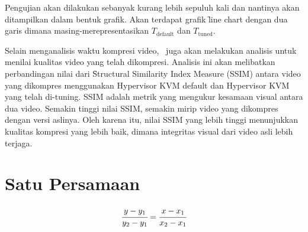     Pengujian akan dilakukan sebanyak kurang lebih sepuluh kali dan nantinya akan ditampilkan dalam bentuk grafik. Akan terdapat grafik \f{line chart} dengan dua garis dimana masing-merepresentasikan $T_{\mathrm{default}}$ dan $T_{\mathrm{tuned}}$.

    Selain menganalisis waktu kompresi video, \saya\ juga akan melakukan analisis untuk menilai kualitas video yang telah dikompresi. Analisis ini akan melibatkan perbandingan nilai dari \f{Structural Similarity Index Measure} (SSIM) antara video yang dikompres menggunakan Hypervisor KVM default dan Hypervisor KVM yang telah di-tuning. SSIM adalah metrik yang mengukur kesamaan visual antara dua video. Semakin tinggi nilai SSIM, semakin mirip video yang dikompres dengan versi aslinya. Oleh karena itu, nilai SSIM yang lebih tinggi menunjukkan kualitas kompresi yang lebih baik, dimana integritas visual dari video asli lebih terjaga.

    \section{Satu Persamaan}

    \noindent \begin{align}\label{eq:garis}
        \cfrac{y - y_{1}}{y_{2} - y_{1}} =
        \cfrac{x - x_{1}}{x_{2} - x_{1}}
    \end{align}


